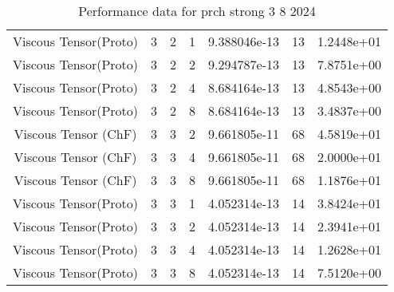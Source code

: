 \documentclass{article}
\begin{document}
\begin{small}
\begin{table}
\begin{center}
\begin{tabular}{|c|c|c|c|c|c||c|}
        Viscous Tensor(Proto) & 3 & 2 & 1& 9.388046e-13 & 13 & 1.2448e+01\\
        Viscous Tensor(Proto) & 3 & 2 & 2& 9.294787e-13 & 13 & 7.8751e+00\\
        Viscous Tensor(Proto) & 3 & 2 & 4& 8.684164e-13 & 13 & 4.8543e+00\\
        Viscous Tensor(Proto) & 3 & 2 & 8& 8.684164e-13 & 13 & 3.4837e+00\\
        \hline 
        Viscous Tensor  (ChF) & 3 & 3 & 2& 9.661805e-11 & 68 & 4.5819e+01\\
        Viscous Tensor  (ChF) & 3 & 3 & 4& 9.661805e-11 & 68 & 2.0000e+01\\
        Viscous Tensor  (ChF) & 3 & 3 & 8& 9.661805e-11 & 68 & 1.1876e+01\\
        Viscous Tensor(Proto) & 3 & 3 & 1& 4.052314e-13 & 14 & 3.8424e+01\\
        Viscous Tensor(Proto) & 3 & 3 & 2& 4.052314e-13 & 14 & 2.3941e+01\\
        Viscous Tensor(Proto) & 3 & 3 & 4& 4.052314e-13 & 14 & 1.2628e+01\\
        Viscous Tensor(Proto) & 3 & 3 & 8& 4.052314e-13 & 14 & 7.5120e+00\\
        \hline 
      \end{tabular} 
    \end{center}   
    \caption{Performance data for  prch strong 3 8 2024} 
  \end{table} 
\end{small}
\end{document}
